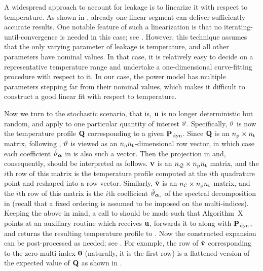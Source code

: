 \begin{remark}
A widespread approach to account for leakage is to linearize it with respect to temperature.
As shown in \cite{liu2007}, already one linear segment can deliver sufficiently accurate results.
One notable feature of such a linearization is that no iterating-until-convergence is needed in this case; see \cite{ukhov2012}.
However, this technique assumes that the only varying parameter of leakage is temperature, and all other parameters have nominal values.
In that case, it is relatively easy to decide on a representative temperature range and undertake a one-dimensional curve-fitting procedure with respect to it.
In our case, the power model has multiple parameters stepping far from their nominal values, which makes it difficult to construct a good linear fit with respect to temperature.
\end{remark}

Now we turn to the stochastic scenario, that is, $\mathbf{u}$ is no longer deterministic but random, and apply  to one particular quantity of interest $\vartheta$.
Specifically, $\vartheta$ is now the temperature profile $\mathbf{Q}$ corresponding to a given $\mathbf{P}_{\text{\kern0.1emdyn}}$.
Since $\mathbf{Q}$ is an ${n_\text{p}} \times {n_\text{t}}$ matrix, following , $\vartheta$ is viewed as an ${n_\text{p}} {n_\text{t}}$-dimensional row vector, in which case each coefficient $\hat{\vartheta}_{\bm{\alpha}}$ in  is also such a vector.
Then the projection in  and, consequently,  should be interpreted as follows.
$\mathbf{v}$ is an ${n_\mathcal{Q}} \times {n_\text{p}} {n_\text{t}}$ matrix, and the $i$th row of this matrix is the temperature profile computed at the $i$th quadrature point and reshaped into a row vector.
Similarly, $\hat{\mathbf{v}}$ is an ${n_\mathcal{C}} \times {n_\text{p}} {n_\text{t}}$ matrix, and the $i$th row of this matrix is the $i$th coefficient $\hat{\vartheta}_{\bm{\alpha}_i}$ of the spectral decomposition in  (recall that a fixed ordering is assumed to be imposed on the multi-indices).
Keeping the above in mind, a call to  should be made such that Algorithm~X points at an auxiliary routine which receives $\mathbf{u}$, forwards it to  along with $\mathbf{P}_{\text{\kern0.1emdyn}}$, and returns the resulting temperature profile to .
Now the constructed expansion can be post-processed as needed; see .
For example, the row of $\hat{\mathbf{v}}$ corresponding to the zero multi-index $\mathbf{0}$ (naturally, it is the first row) is a flattened version of the expected value of $\mathbf{Q}$ as shown in .
